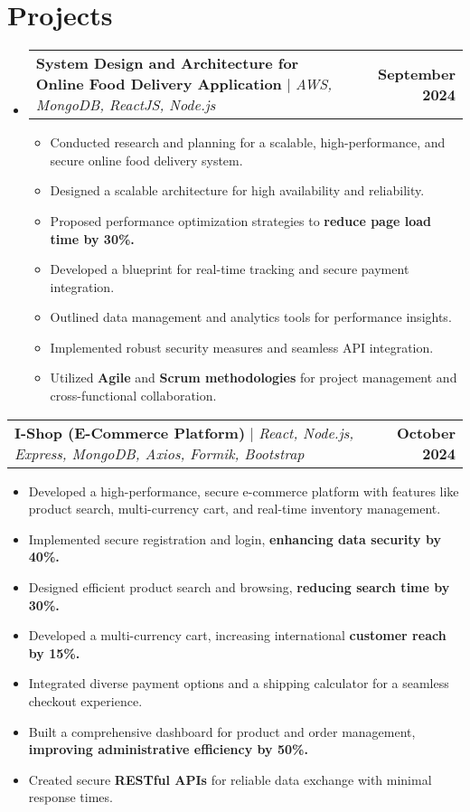 \documentclass[letterpaper,11pt]{article}
\makeatletter
\newcommand{\resumeItem}[1]{
  \item\small{
    {#1 \vspace{-2pt}}
  }
}
\newcommand{\resumeProjectHeading}[2]{
    \item
    \begin{tabular*}{1.001\textwidth}{l@{\extracolsep{\fill}}r}
      \small#1 & \textbf{\small #2}\\
    \end{tabular*}\vspace{-7pt}
}
\newcommand{\resumeSubHeadingListStart}{\begin{itemize}[leftmargin=0.0in, label={}]}
\newcommand{\resumeSubHeadingListEnd}{\end{itemize}}
\newcommand{\resumeItemListStart}{\begin{itemize}}
\newcommand{\resumeItemListEnd}{\end{itemize}\vspace{-5pt}}
\makeatother
\begin{document}
\section{Projects}
    \vspace{-5pt}
    \resumeSubHeadingListStart
        \resumeProjectHeading
          {\textbf{System Design and Architecture for Online Food Delivery Application} $|$ \emph{AWS, MongoDB, ReactJS, Node.js}}{September 2024}
          \resumeItemListStart
            \resumeItem{Conducted research and planning for a scalable, high-performance, and secure online food delivery system.}
            \resumeItem{Designed a scalable architecture for high availability and reliability.}
            \resumeItem{Proposed performance optimization strategies to\textbf{ reduce page load time by 30\%.}}
            \resumeItem{Developed a blueprint for real-time tracking and secure payment integration.}
            \resumeItem{Outlined data management and analytics tools for performance insights.}
            \resumeItem{Implemented robust security measures and seamless API integration.}
            \resumeItem{Utilized \textbf{Agile} and \textbf{Scrum methodologies} for project management and cross-functional collaboration.}
          \resumeItemListEnd
           \vspace{-16pt}
    \resumeSubHeadingListEnd





\resumeProjectHeading
    {\textbf{I-Shop (E-Commerce Platform)} $|$ \emph{React, Node.js, Express, MongoDB, Axios, Formik, Bootstrap}}{October 2024}
    \resumeItemListStart
        \resumeItem{Developed a high-performance, secure e-commerce platform with features like product search, multi-currency cart, and real-time inventory management.}
        \resumeItem{Implemented secure registration and login, \textbf{enhancing data security by 40\%.}}
        \resumeItem{Designed efficient product search and browsing, \textbf{reducing search time by 30\%.}}
        \resumeItem{Developed a multi-currency cart, increasing international \textbf{customer reach by 15\%.}}
        \resumeItem{Integrated diverse payment options and a shipping calculator for a seamless checkout experience.}
        \resumeItem{Built a comprehensive dashboard for product and order management, \textbf{improving administrative efficiency by 50\%.}}
        \resumeItem{Created secure\textbf{ RESTful APIs} for reliable data exchange with minimal response times.}
    \resumeItemListEnd
    \vspace{-16pt}
\end{document}
